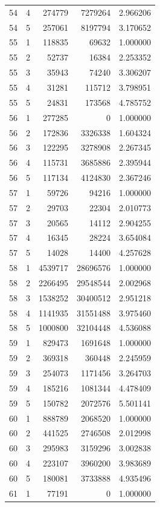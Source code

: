 \begin{longtable}{rrrrr}
54 & 4 & 274779 & 7279264 & 2.966206 \\
54 & 5 & 257061 & 8197794 & 3.170652 \\
55 & 1 & 118835 & 69632 & 1.000000 \\
55 & 2 & 52737 & 16384 & 2.253352 \\
55 & 3 & 35943 & 74240 & 3.306207 \\
55 & 4 & 31281 & 115712 & 3.798951 \\
55 & 5 & 24831 & 173568 & 4.785752 \\
56 & 1 & 277285 & 0 & 1.000000 \\
56 & 2 & 172836 & 3326338 & 1.604324 \\
56 & 3 & 122295 & 3278908 & 2.267345 \\
56 & 4 & 115731 & 3685886 & 2.395944 \\
56 & 5 & 117134 & 4124830 & 2.367246 \\
57 & 1 & 59726 & 94216 & 1.000000 \\
57 & 2 & 29703 & 22304 & 2.010773 \\
57 & 3 & 20565 & 14112 & 2.904255 \\
57 & 4 & 16345 & 28224 & 3.654084 \\
57 & 5 & 14028 & 14400 & 4.257628 \\
58 & 1 & 4539717 & 28696576 & 1.000000 \\
58 & 2 & 2266495 & 29548544 & 2.002968 \\
58 & 3 & 1538252 & 30400512 & 2.951218 \\
58 & 4 & 1141935 & 31551488 & 3.975460 \\
58 & 5 & 1000800 & 32104448 & 4.536088 \\
59 & 1 & 829473 & 1691648 & 1.000000 \\
59 & 2 & 369318 & 360448 & 2.245959 \\
59 & 3 & 254073 & 1171456 & 3.264703 \\
59 & 4 & 185216 & 1081344 & 4.478409 \\
59 & 5 & 150782 & 2072576 & 5.501141 \\
60 & 1 & 888789 & 2068520 & 1.000000 \\
60 & 2 & 441525 & 2746508 & 2.012998 \\
60 & 3 & 295983 & 3159296 & 3.002838 \\
60 & 4 & 223107 & 3960200 & 3.983689 \\
60 & 5 & 180081 & 3733888 & 4.935496 \\
61 & 1 & 77191 & 0 & 1.000000 \\

\end{longtable}
